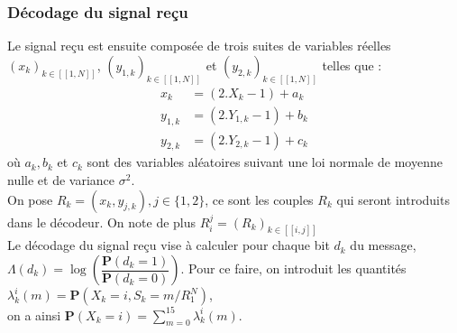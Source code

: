 \documentclass[12pt]{article}
\begin{document}
\subsubsection{D\'ecodage du signal re\c{c}u}
Le signal re\c{c}u est ensuite compos\'ee de trois suites de variables r\'eelles $(x_k)_{k \in [\![1, N]\!]}$, $(y_{1,k})_{k \in [\![1, N]\!]}$ et $(y_{2,k})_{k \in [\![1, N]\!]}$ telles que :
\begin{align*} \label{dec_input}
	x_k & = (2.X_k - 1) + a_k \\
	y_{1,k} & = (2.Y_{1,k} - 1) + b_k \\
	y_{2,k} & = (2.Y_{2,k} - 1) + c_k
\end{align*}
o\`u $a_k, b_k$ et $c_k$ sont des variables al\'eatoires suivant une loi normale de moyenne nulle et de variance $\sigma^2$.\\
On pose $R_k = (x_k,y_{j,k}), j \in \{1, 2\}$, ce sont les couples $R_k$ qui seront introduits dans le d\'ecodeur. On note de plus $R_i^j = (R_k)_{k \in [\![i, j]\!]}$\\
Le d\'ecodage du signal re\c{c}u vise \`a calculer pour chaque bit $d_k$ du message, $\Lambda(d_k) = \log\left(\dfrac{\mathbf{P}(d_k = 1)}{\mathbf{P}(d_k = 0)}\right)$. Pour ce faire, on introduit les quantit\'es $\lambda_k^i(m) = \mathbf{P}(X_k = i, S_k = m / R_1^N)$,\\
on a ainsi $\mathbf{P}(X_k = i) = \sum\limits_{m=0}^{15} \lambda_k^i(m)$.\\
\end{document}
